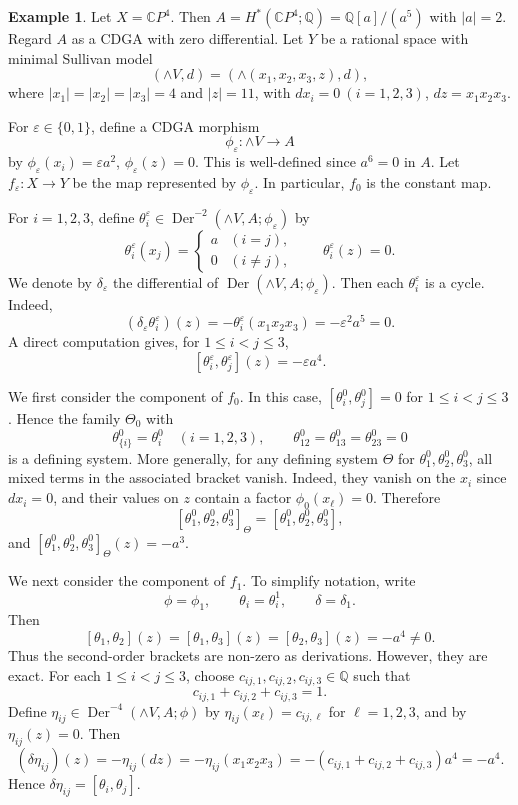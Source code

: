 \documentclass[a4paper,10pt]{amsart}
\theoremstyle{definition}
\newtheorem{ex}[thm]{Example}
\theoremstyle{remark}
\newcommand{\Der}{\operatorname{Der}}
\numberwithin{equation}{section}
\begin{document}
\begin{ex}\label{ex:cp4-indeterminacy}
Let $X=\mathbb{C}P^4$. Then
$
A=H^*(\mathbb{C}P^4;\mathbb{Q})=\mathbb{Q}[a]/(a^5)
$
with $|a|=2$.
Regard $A$ as a CDGA with zero differential.
Let $Y$ be a rational space with minimal Sullivan model
\[
(\wedge V,d)=(\wedge(x_1,x_2,x_3,z),d),
\]
where
$
|x_1|=|x_2|=|x_3|=4
$
and $|z|=11$, with
$dx_i=0 \ (i=1,2,3)$, $dz=x_1x_2x_3$.

For $\varepsilon\in\{0,1\}$, define a CDGA morphism
\[
\phi_\varepsilon:\wedge V\longrightarrow A
\]
by $\phi_\varepsilon(x_i)=\varepsilon a^2$,  $\phi_\varepsilon(z)=0$.
This is well-defined since $a^6=0$ in $A$.
Let $f_\varepsilon:X\to Y$ be the map represented by
$\phi_\varepsilon$. In particular, $f_0$ is the constant map.

For $i=1,2,3$, define
$
\theta_i^\varepsilon
\in
\Der^{-2}(\wedge V,A;\phi_\varepsilon)
$
by
\[
\theta_i^\varepsilon(x_j)
=
\begin{cases}
a & (i=j),\\
0 & (i\neq j),
\end{cases}
\qquad
\theta_i^\varepsilon(z)=0.
\]
We denote by $\delta_\varepsilon$ the differential of
$\Der(\wedge V,A;\phi_\varepsilon)$.
Then each $\theta_i^\varepsilon$ is a cycle. Indeed,
\[
(\delta_\varepsilon\theta_i^\varepsilon)(z)
=
-\theta_i^\varepsilon(x_1x_2x_3)
=
-\varepsilon^2a^5
=
0.
\]
A direct computation gives, for $1\leq i<j\leq3$,
\[
[\theta_i^\varepsilon,\theta_j^\varepsilon](z)
=
-\varepsilon a^4.
\]

We first consider the component of $f_0$.
In this case,
$
[\theta_i^0,\theta_j^0]=0
$
for
$1\leq i<j\leq3$.
Hence the family $\Theta_0$ with
\[
\theta_{\{i\}}^0=\theta_i^0
\quad(i=1,2,3),
\qquad
\theta_{12}^0=\theta_{13}^0=\theta_{23}^0=0
\]
is a defining system.
More generally, for any defining system $\Theta$ for
$\theta_1^0,\theta_2^0,\theta_3^0$, all mixed terms in the associated bracket
vanish. Indeed, they vanish on the $x_i$ since $dx_i=0$, and their values on
$z$ contain a factor $\phi_0(x_\ell)=0$.
Therefore
\[
[\theta_1^0,\theta_2^0,\theta_3^0]_\Theta
=
[\theta_1^0,\theta_2^0,\theta_3^0],
\]
and
$[\theta_1^0,\theta_2^0,\theta_3^0]_\Theta(z)
=
-a^3.
$

We next consider the component of $f_1$.
To simplify notation, write
\[
\phi=\phi_1,
\qquad
\theta_i=\theta_i^1,
\qquad
\delta=\delta_1.
\]
Then
\[
[\theta_1,\theta_2](z)
=
[\theta_1,\theta_3](z)
=
[\theta_2,\theta_3](z)
=
-a^4
\neq0.
\]
Thus the second-order brackets are non-zero as derivations. However, they
are exact.
For each $1\leq i<j\leq3$,  choose
$
c_{ij,1},c_{ij,2},c_{ij,3}\in\mathbb{Q}
$
such that
\[
        c_{ij,1}+c_{ij,2}+c_{ij,3}=1.
\]
Define
$
\eta_{ij}\in \Der^{-4}(\wedge V,A;\phi)
$
by
$
\eta_{ij}(x_\ell)=c_{ij,\ell}
$
for $\ell=1,2,3$, and by $\eta_{ij}(z)=0$. 
Then
\[
(\delta\eta_{ij})(z)
=
-\eta_{ij}(dz)
=
-\eta_{ij}(x_1x_2x_3)
=
-(c_{ij,1}+c_{ij,2}+c_{ij,3})a^4
=
-a^4.
\]
Hence $\delta\eta_{ij}=[\theta_i,\theta_j]$.


\end{ex}
\end{document}
